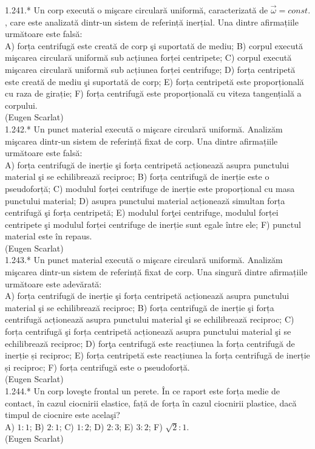 1.241.* Un corp execută o mişcare circulară uniformă, caracterizată de $\vec{\omega}=const.$, care este analizată dintr-un sistem de referință inerțial. Una dintre afirmațiile următoare este falsă:\\ A) forța centrifugă este creată de corp şi suportată de mediu; B) corpul execută mişcarea circulară uniformă sub acțiunea forței centripete; C) corpul execută mişcarea circulară uniformă sub acțiunea forței centrifuge; D) forța centripetă este creată de mediu şi suportată de corp; E) forța centripetă este proporțională cu raza de girație; F) forța centrifugă este proporțională cu viteza tangențială a corpului.\\ (Eugen Scarlat)\\

1.242.* Un punct material execută o mişcare circulară uniformă. Analizăm mişcarea dintr-un sistem de referință fixat de corp. Una dintre afirmațiile următoare este falsă:\\ A) forța centrifugă de inerție şi forța centripetă acționează asupra punctului material şi se echilibrează reciproc; B) forța centrifugă de inerție este o pseudoforță; C) modulul forței centrifuge de inerție este proporțional cu masa punctului material; D) asupra punctului material acționează simultan forța centrifugă şi forța centripetă; E) modulul forţei centrifuge, modulul forței centripete şi modulul forței centrifuge de inerție sunt egale între ele; F) punctul material este în repaus.\\ (Eugen Scarlat)\\

1.243.* Un punct material execută o mişcare circulară uniformă. Analizăm mişcarea dintr-un sistem de referință fixat de corp. Una singură dintre afirmațiile următoare este adevărată:\\ A) forța centrifugă de inerție şi forța centripetă acționează asupra punctului material şi se echilibrează reciproc; B) forța centrifugă de inerție şi forța centrifugă acționează asupra punctului material şi se echilibrează reciproc; C) forța centrifugă şi forța centripetă acționează asupra punctului material şi se echilibrează reciproc; D) forţa centrifugă este reacțiunea la forța centrifugă de inerție și reciproc; E) forța centripetă este reacțiunea la forța centrifugă de inerție și reciproc; F) forța centrifugă este o pseudoforță.\\ (Eugen Scarlat)\\

1.244.* Un corp loveşte frontal un perete. În ce raport este forța medie de contact, în cazul ciocnirii elastice, față de forța în cazul ciocnirii plastice, dacă timpul de ciocnire este acelaşi?\\ A) $1: 1$; B) $2: 1$; C) $1: 2$; D) $2: 3$; E) $3: 2$; F) $\sqrt{2}: 1$.\\ (Eugen Scarlat)\\

